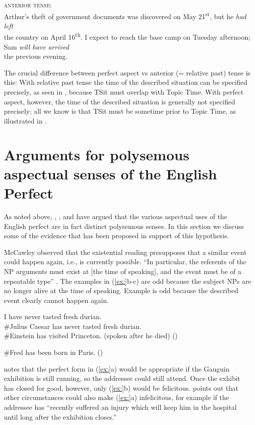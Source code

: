 \ea
\textsc{anterior tense:}\\
\ea  Arthur’s theft of government documents was discovered on May 21\textsuperscript{st}, but he \textit{had left} \\
the country on April 16\textsuperscript{th}.
\ex  I expect to reach the base camp on Tuesday afternoon; Sam \textit{will have arrived} \\
the previous evening.
\z \z


The crucial difference between perfect aspect vs anterior (= relative past) tense is this: With relative past tense the time of the described situation can be specified precisely, as seen in , because TSit must overlap with Topic Time. With perfect aspect, however, the time of the described situation is generally not specified precisely; all we know is that TSit must be sometime prior to Topic Time, as illustrated in .


\section{Arguments for polysemous aspectual senses of the English Perfect}\label{sec:22.4}

As noted above, \citet{McCawley1971,McCawley1981b}, \citet{Michaelis1994,Michaelis1998}, and \citet{Kiparsky2002} have argued that the various aspectual uses of the English perfect are in fact distinct polysemous senses. In this section we discuss some of the evidence that has been proposed in support of this hypothesis.


McCawley observed that the existential reading presupposes that a similar event could happen again, i.e., is currently possible. “In particular, the referents of the NP arguments must exist at [the time of speaking], and the event must be of a repeatable type” \citep{Kiparsky2002}. The examples in (\ref{ex:}b-c) are odd because the subject NPs are no longer alive at the time of speaking. Example  is odd because the described event clearly cannot happen again. 


\ea
\ea I have never tasted fresh durian.\\
\ex \#Julius Caesar has never tasted fresh durian.\\
\ex \#Einstein has visited Princeton. (spoken after he died) (\citealt{Chomsky1970})
                       \z
\z

\ea
\#Fred has been born in Paris.  (\citealt{Kiparsky2002})
\z


\citet[33]{Leech1971} notes that the perfect form in (\ref{ex:}a) would be appropriate if the Gauguin exhibition is still running, so the addressee could still attend. Once the exhibit has closed for good, however, only (\ref{ex:}b) would be felicitous. \citet[107]{McCawley1971} points out that other circumstances could also make (\ref{ex:}a) infelicitous, for example if the addressee has “recently suffered an injury which will keep him in the hospital until long after the exhibition closes.”


